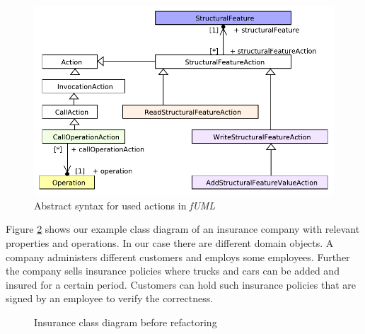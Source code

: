 \documentclass{llncs}
\begin{document}
\begin{figure}[h!t]
 \centering
 \includegraphics[scale=0.8]{images/Model_Model_Behavior}
 \caption{Abstract syntax for used actions in \textit{fUML}}
 \label{fig:fuml2}
\end{figure}

Figure \ref{fig:classdiagramcomplex} shows our example class diagram of an insurance company with relevant properties and operations. 
In our case there are different domain objects. A company administers different customers and employs some employees. Further the company 
sells insurance policies where trucks and cars can be added and insured for a certain period. Customers can hold such insurance 
policies that are signed by an employee to verify the correctness.

\begin{figure}[h!t]
 \centering
 \caption{Insurance class diagram before refactoring}
 \label{fig:classdiagramcomplex}
\end{figure}
\end{document}
